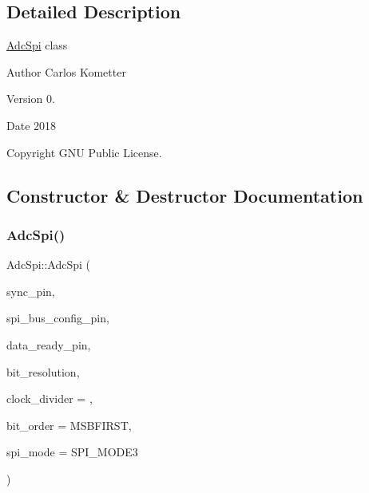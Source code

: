 \subsection{Detailed Description}
\mbox{\hyperlink{classAdcSpi}{Adc\+Spi}} class \begin{DoxyAuthor}{Author}
Carlos Kometter 
\end{DoxyAuthor}
\begin{DoxyVersion}{Version}
0. 
\end{DoxyVersion}
\begin{DoxyDate}{Date}
2018 
\end{DoxyDate}
\begin{DoxyCopyright}{Copyright}
G\+NU Public License. 
\end{DoxyCopyright}


\subsection{Constructor \& Destructor Documentation}
\mbox{\label{classAdcSpi_a3c66ca397c2a9d0a7c475ee551b3c388}} 
\subsubsection{\texorpdfstring{Adc\+Spi()}{AdcSpi()}}
{\footnotesize\ttfamily Adc\+Spi\+::\+Adc\+Spi (\begin{DoxyParamCaption}\item[{uint8\+\_\+t}]{sync\+\_\+pin,  }\item[{uint8\+\_\+t}]{spi\+\_\+bus\+\_\+config\+\_\+pin,  }\item[{uint8\+\_\+t}]{data\+\_\+ready\+\_\+pin,  }\item[{uint8\+\_\+t}]{bit\+\_\+resolution,  }\item[{uint8\+\_\+t}]{clock\+\_\+divider = {},  }\item[{Bit\+Order}]{bit\+\_\+order = {\ttfamily MSBFIRST},  }\item[{uint8\+\_\+t}]{spi\+\_\+mode = {\ttfamily SPI\+\_\+MODE3} }\end{DoxyParamCaption})}

